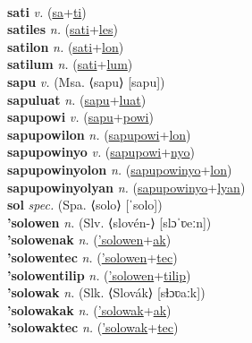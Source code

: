  \label{'sakantium} \\
\textbf{sati} \textit{v.} (\hyperref[sa]{sa}+\hyperref[ti]{ti})
 \label{sati} \\
\textbf{satiles} \textit{n.} (\hyperref[sati]{sati}+\hyperref[les]{les})
 \label{satiles} \\
\textbf{satilon} \textit{n.} (\hyperref[sati]{sati}+\hyperref[lon]{lon})
 \label{satilon} \\
\textbf{satilum} \textit{n.} (\hyperref[sati]{sati}+\hyperref[lum]{lum})
 \label{satilum} \\
\textbf{sapu} \textit{v.} (Msa. ⟨sapu⟩ [sapu])
 \label{sapu} \\
\textbf{sapuluat} \textit{n.} (\hyperref[sapu]{sapu}+\hyperref[luat]{luat})
 \label{sapuluat} \\
\textbf{sapupowi} \textit{v.} (\hyperref[sapu]{sapu}+\hyperref[powi]{powi})
 \label{sapupowi} \\
\textbf{sapupowilon} \textit{n.} (\hyperref[sapupowi]{sapupowi}+\hyperref[lon]{lon})
 \label{sapupowilon} \\
\textbf{sapupowinyo} \textit{v.} (\hyperref[sapupowi]{sapupowi}+\hyperref[nyo]{nyo})
 \label{sapupowinyo} \\
\textbf{sapupowinyolon} \textit{n.} (\hyperref[sapupowinyo]{sapupowinyo}+\hyperref[lon]{lon})
 \label{sapupowinyolon} \\
\textbf{sapupowinyolyan} \textit{n.} (\hyperref[sapupowinyo]{sapupowinyo}+\hyperref[lyan]{lyan})
 \label{sapupowinyolyan} \\
\textbf{sol} \textit{spec.} (Spa. ⟨solo⟩ [ˈsolo])
 \label{sol} \\
\textbf{'solowen} \textit{n.} (Slv. ⟨slovén-⟩ [slɔˈʋeːn])
 \label{'solowen} \\
\textbf{'solowenak} \textit{n.} (\hyperref['solowen]{'solowen}+\hyperref[ak]{ak})
 \label{'solowenak} \\
\textbf{'solowentec} \textit{n.} (\hyperref['solowen]{'solowen}+\hyperref[tec]{tec})
 \label{'solowentec} \\
\textbf{'solowentilip} \textit{n.} (\hyperref['solowen]{'solowen}+\hyperref[tilip]{tilip})
 \label{'solowentilip} \\
\textbf{'solowak} \textit{n.} (Slk. ⟨Slovák⟩ [sɫɔʋaːk])
 \label{'solowak} \\
\textbf{'solowakak} \textit{n.} (\hyperref['solowak]{'solowak}+\hyperref[ak]{ak})
 \label{'solowakak} \\
\textbf{'solowaktec} \textit{n.} (\hyperref['solowak]{'solowak}+\hyperref[tec]{tec})
